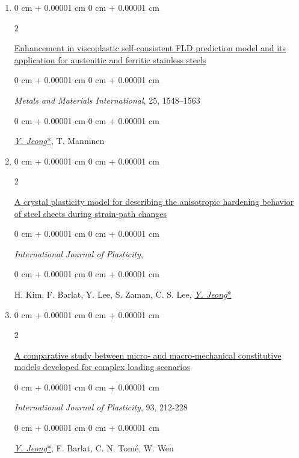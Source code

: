 \documentclass[10pt, letterpaper]{article}
\newenvironment{onecolentry}{
    \begin{adjustwidth}{
        0 cm + 0.00001 cm
    }{
        0 cm + 0.00001 cm
    }
}{
    \end{adjustwidth}
} %
\newenvironment{twocolentry}[2][]{
    \onecolentry
    \def\secondColumn{#2}
    \setcolumnwidth{\fill, 4.5 cm}
    \begin{paracol}{2}
}{
    \switchcolumn \raggedleft \secondColumn
    \end{paracol}
    \endonecolentry
} %
\begin{document}
\begin{enumerate}
        \item
        \begin{twocolentry}{2019}
            \href{https://doi.org/10.1007/s12540-019-00292-5}{Enhancement in viscoplastic self-consistent FLD prediction model and its application for austenitic and ferritic stainless steels}
        \end{twocolentry}
        \begin{onecolentry}
            {\it Metals and Materials International}, 25, 1548–1563
        \end{onecolentry}
        \begin{onecolentry}
            {\underline{\textit{Y. Jeong}*}}, T. Manninen
        \end{onecolentry}
        \vspace{0.10 cm}



        \item
        \begin{twocolentry}{2018}
            \href{https://doi.org/10.1016/j.ijplas.2018.07.010}{A crystal plasticity model for describing the anisotropic hardening behavior of steel
            sheets during strain‑path changes }
        \end{twocolentry}
        \begin{onecolentry}
            {\it International Journal of Plasticity},
        \end{onecolentry}
        \begin{onecolentry}
            H. Kim, F. Barlat, Y. Lee, S. Zaman, C. S. Lee, {\underline{\textit{Y. Jeong}*}}
        \end{onecolentry}
        \vspace{0.10 cm}


        \item
        \begin{twocolentry}{2017}
            \href{http://dx.doi.org/10.1016/j.ijplas.2016.07.015}{A comparative study between micro‑ and macro‑mechanical constitutive models developed for complex loading scenarios }
        \end{twocolentry}
        \begin{onecolentry}
            {\it International Journal of Plasticity}, 93, 212‑228
        \end{onecolentry}
        \begin{onecolentry}
            {\underline{\textit{Y. Jeong}*}}, F. Barlat, C. N. Tomé, W. Wen
        \end{onecolentry}
        \vspace{0.10 cm}



\end{enumerate}
\end{document}
